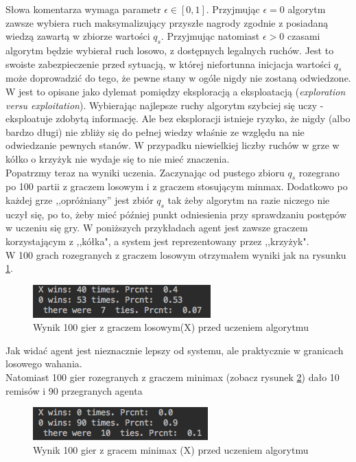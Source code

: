 \documentclass[licencjacka]{pracamgr}
\begin{document}
Słowa komentarza wymaga parametr $\epsilon\in[0,1]$. Przyjmując $\epsilon=0$ algorytm zawsze wybiera ruch maksymalizujący przyszłe nagrody zgodnie z posiadaną wiedzą zawartą w zbiorze wartości $q_{s}$. Przyjmując natomiast $\epsilon>0$ czasami algorytm będzie wybierał ruch losowo, z dostępnych legalnych ruchów. Jest to swoiste zabezpieczenie przed sytuacją, w której niefortunna inicjacja wartości $q_{s}$ może doprowadzić do tego, że pewne stany w ogóle nigdy nie zostaną odwiedzone. W \cite{RL} jest to opisane jako dylemat pomiędzy eksploracją a eksploatacją (\textit{exploration versu exploitation}). Wybierając najlepsze ruchy algorytm szybciej się uczy - eksploatuje zdobytą informację. Ale bez eksploracji istnieje ryzyko, że nigdy (albo bardzo długi) nie zbliży się do pełnej wiedzy właśnie ze względu na nie odwiedzanie pewnych stanów.  W przypadku niewielkiej liczby ruchów w grze w kółko o krzyżyk nie wydaje się to nie mieć znaczenia. \\

Popatrzmy  teraz na wyniki uczenia. Zaczynając od pustego zbioru $q_{s}$ rozegrano po 100 partii z graczem losowym i z graczem stosującym minmax. Dodatkowo po każdej grze ,,opróżniany'' jest zbiór $q_{s}$ tak żeby algorytm na razie niczego nie uczył się,   po to, żeby mieć później punkt odniesienia przy sprawdzaniu postępów w uczeniu się gry. W poniższych przykładach agent jest zawsze graczem korzystającym z ,,kółka", a system jest reprezentowany przez ,,krzyżyk". \\

W 100 grach rozegranych z graczem losowym otrzymałem wyniki jak na rysunku \ref{Rys14}.\\
\begin{figure}[h!]
	\includegraphics [scale=0.8]{Qtable_vs_Rnd_untrained.png}
	\caption{Wynik 100 gier z graczem losowym(X) przed uczeniem algorytmu}
	\label{Rys14}
\end{figure}
Jak widać agent jest nieznacznie lepszy od systemu, ale praktycznie w granicach losowego wahania.\\

Natomiast 100 gier rozegranych z graczem minimax (zobacz rysunek \ref{Rys15}) dało 10 remisów i 90 przegranych agenta\\
\begin{figure}[h!]
	\includegraphics [scale=0.8]{QTable_vs_Minimax_untrained.png}
	\caption{Wynik 100 gier z gracem minimax (X) przed uczeniem algorytmu}
	\label{Rys15}
\end{figure}
\end{document}
